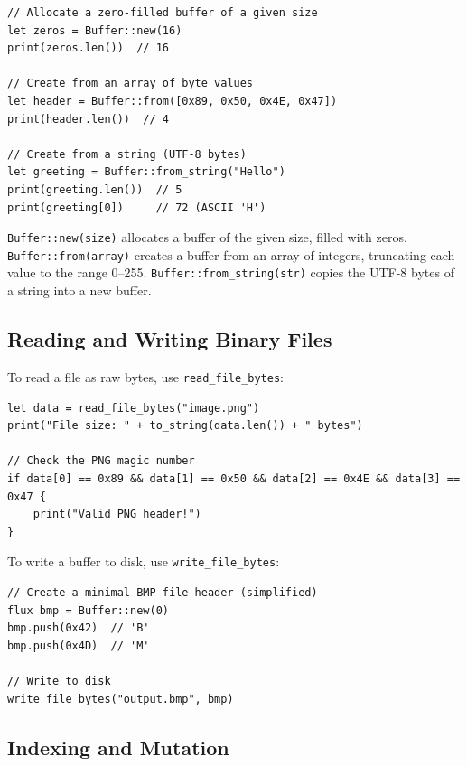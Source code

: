 \begin{lstlisting}[language=Lattice, caption={Creating Buffers}]
// Allocate a zero-filled buffer of a given size
let zeros = Buffer::new(16)
print(zeros.len())  // 16

// Create from an array of byte values
let header = Buffer::from([0x89, 0x50, 0x4E, 0x47])
print(header.len())  // 4

// Create from a string (UTF-8 bytes)
let greeting = Buffer::from_string("Hello")
print(greeting.len())  // 5
print(greeting[0])     // 72 (ASCII 'H')
\end{lstlisting}

\lstinline|Buffer::new(size)| allocates a buffer of the given size, filled
with zeros. \lstinline|Buffer::from(array)| creates a buffer from an array
of integers, truncating each value to the range 0--255.
\lstinline|Buffer::from_string(str)| copies the UTF-8 bytes of a string into
a new buffer.

\subsection{Reading and Writing Binary Files}\label{sec:binary-files}

To read a file as raw bytes, use \lstinline|read_file_bytes|:

\begin{lstlisting}[language=Lattice, caption={Reading a binary file}]
let data = read_file_bytes("image.png")
print("File size: " + to_string(data.len()) + " bytes")

// Check the PNG magic number
if data[0] == 0x89 && data[1] == 0x50 && data[2] == 0x4E && data[3] == 0x47 {
    print("Valid PNG header!")
}
\end{lstlisting}

To write a buffer to disk, use \lstinline|write_file_bytes|:

\begin{lstlisting}[language=Lattice, caption={Writing binary data to a file}]
// Create a minimal BMP file header (simplified)
flux bmp = Buffer::new(0)
bmp.push(0x42)  // 'B'
bmp.push(0x4D)  // 'M'

// Write to disk
write_file_bytes("output.bmp", bmp)
\end{lstlisting}

\subsection{Indexing and Mutation}\label{sec:buffer-indexing}

